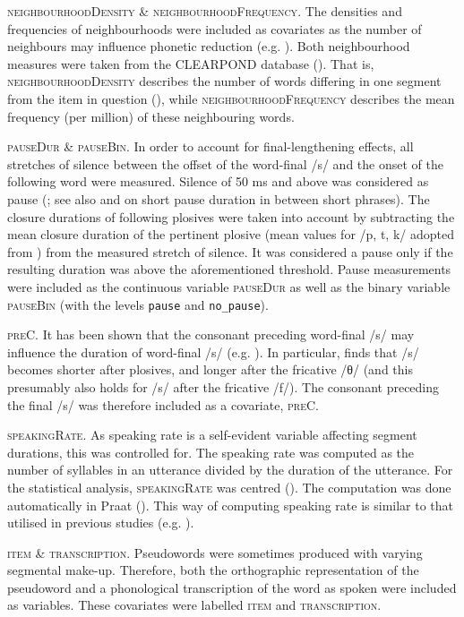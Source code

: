 \textsc{neighbourhoodDensity} \& \textsc{neighbourhoodFrequency}. The densities and frequencies of neighbourhoods were included as covariates as the number of neighbours may influence phonetic reduction (e.g. \cite{Gahl2012}). Both neighbourhood measures were taken from the CLEARPOND database (\cite{Marian2012}). That is, \textsc{neighbourhoodDensity} describes the number of words differing in one segment from the item in question (\cite[3]{Marian2012}), while \textsc{neighbourhoodFrequency} describes the mean frequency (per million) of these neighbouring words.

\textsc{pauseDur} \& \textsc{pauseBin}. In order to account for final-lengthening effects, all stretches of silence between the offset of the word-final /s/ and the onset of the following word were measured. Silence of 50 ms and above was considered as pause (\cite{Lee1999}; see also \cite{Zvonik2003} and \cite{Krivokapic2007} on short pause duration in between short phrases). The closure durations of following plosives were taken into account by subtracting the mean closure duration of the pertinent plosive (mean values for /p, t, k/ adopted from \cite{Yao2007}) from the measured stretch of silence. It was considered a pause only if the resulting duration was above the aforementioned threshold. Pause measurements were included as the continuous variable \textsc{pauseDur} as well as the binary variable \textsc{pauseBin} (with the levels \texttt{pause} and \texttt{no\_pause}).

\textsc{preC}. It has been shown that the consonant preceding word-final /s/ may influence the duration of word-final /s/ (e.g. \cite{Umeda1977}). In particular, \citet[853]{Umeda1977} finds that /s/ becomes shorter after plosives, and longer after the fricative /θ/ (and this presumably also holds for /s/ after the fricative /f/). The consonant preceding the final /s/ was therefore included as a covariate, \textsc{preC}.

\textsc{speakingRate}. As speaking rate is a self-evident variable affecting segment durations, this was controlled for. The speaking rate was computed as the number of syllables in an utterance divided by the duration of the utterance. For the statistical analysis, \textsc{speakingRate} was centred (\cite{Robinson2009, Afshartous2011, Winter2019}). The computation was done automatically in Praat (\cite{deJong2008}). This way of computing speaking rate is similar to that utilised in previous studies (e.g. \cite{Plag2017}).

\textsc{item} \& \textsc{transcription}. Pseudowords were sometimes produced with varying segmental make-up. Therefore, both the orthographic representation of the pseudoword and a phonological transcription of the word as spoken were included as variables. These covariates were labelled \textsc{item} and \textsc{transcription}.

